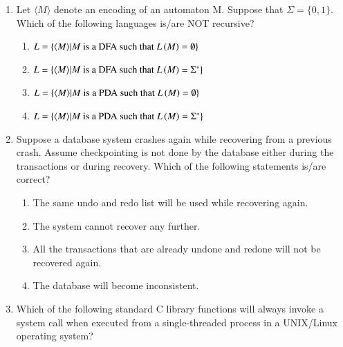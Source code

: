 \documentclass[a4paper, 11pt]{article}
\begin{document}
\begin{enumerate}
    \item Let $\langle M \rangle$ denote an encoding of an automaton M. Suppose that $\Sigma = \{0,1\}$. Which of the following languages is/are NOT recursive?
    \begin{enumerate}
        \item $L = \{\langle M \rangle | M \text{ is a DFA such that } L\left(M\right) = \emptyset\}$
        \item $L = \{\langle M \rangle | M \text{ is a DFA such that } L\left(M\right) = \Sigma^*\}$
        \item $L = \{\langle M \rangle | M \text{ is a PDA such that } L\left(M\right) = \emptyset\}$
        \item $L = \{\langle M \rangle | M \text{ is a PDA such that } L\left(M\right) = \Sigma^*\}$
    \end{enumerate}
    \hfill{}
    
    \item Suppose a database system crashes again while recovering from a previous crash. Assume checkpointing is not done by the database either during the transactions or during recovery. Which of the following statements is/are correct?
    \begin{enumerate}
        \item The same undo and redo list will be used while recovering again.
        \item The system cannot recover any further.
        \item All the transactions that are already undone and redone will not be recovered again.
        \item The database will become inconsistent.
    \end{enumerate}
    \hfill{}
    
    \item Which of the following standard C library functions will always invoke a system call when executed from a single-threaded process in a UNIX/Linux operating system?
    \begin{enumerate}
    \end{enumerate}
    \hfill{}
    

\end{enumerate}
\end{document}
